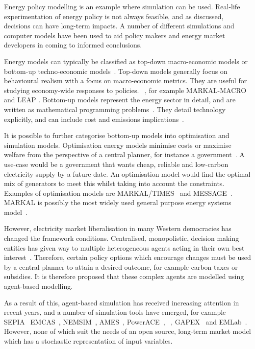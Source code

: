 Energy policy modelling is an example where simulation can be used. Real-life experimentation of energy policy is not always feasible, and as discussed, decisions can have long-term impacts. A number of different simulations and computer models have been used to aid policy makers and energy market developers in coming to informed conclusions.

Energy models can typically be classified as top-down macro-economic models or bottom-up techno-economic models~\cite{Bohringer1998}. Top-down models generally focus on behavioural realism with a focus on macro-economic metrics. They are useful for studying economy-wide responses to policies. ~\cite{Hall2016}, for example MARKAL-MACRO \cite{Fishbone1981} and LEAP \cite{Heaps2016}. Bottom-up models represent the energy sector in detail, and are written as mathematical programming problems~\cite{Gargiulo2013}. They detail technology explicitly, and can include cost and emissions implications~\cite{Hall2016}.

It is possible to further categorise bottom-up models into optimisation and simulation models. Optimisation energy models minimise costs or maximise welfare from the perspective of a central planner, for instance a government~\cite{Keles2017}. A use-case would be a government that wants cheap, reliable and low-carbon electricity supply by a future date. An optimisation model would find the optimal mix of generators to meet this whilst taking into account the constraints. Examples of optimisation models are MARKAL/TIMES~\cite{Fishbone1981} and MESSAGE~\cite{Schrattenholzer1981}. MARKAL is possibly the most widely used general purpose energy systems model~\cite{Pfenninger2014}.

However, electricity market liberalisation in many Western democracies has changed the framework conditions. Centralised, monopolistic, decision making entities has given way to multiple heterogeneous agents acting in their own best interest~\cite{Most2010}. Therefore, certain policy options which encourage changes must be used by a central planner to attain a desired outcome, for example carbon taxes or subsidies. It is therefore proposed that these complex agents are modelled using agent-based modelling.

As a result of this, agent-based simulation has received increasing attention in recent years, and a number of simulation tools have emerged, for example SEPIA~\cite{Harp2000} EMCAS~\cite{Conzelmann}, NEMSIM~\cite{Batten2006}, AMES~\cite{Sun2007}, PowerACE~\cite{Rothengatter2007}, ~\cite{Praca2003}, GAPEX~\cite{Cincotti2013} and  EMLab~\cite{Chappin2017}. However, none of which suit the needs of an open source, long-term market model which has a stochastic representation of input variables.

